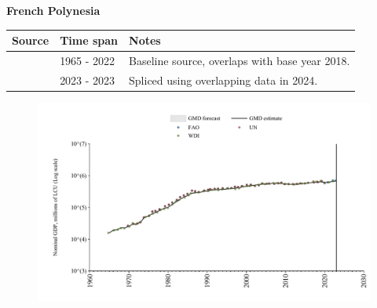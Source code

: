 \documentclass[12pt,a4paper,landscape]{article}
\begin{document}
\begin{adjustbox}{max totalsize={\paperwidth}{\paperheight},center}
\begin{minipage}[t][\textheight][t]{\textwidth}
\vspace*{0.5cm}
{}
\begin{center}
{\Large\bfseries French Polynesia}
\end{center}
\vspace{0.5cm}
\begin{table}[H]
\centering
\small
\begin{tabular}{|l|l|l|}
\hline
\textbf{Source} & \textbf{Time span} & \textbf{Notes} \\
\hline
\rowcolor{white}\cite{WDI}& 1965 - 2022 &Baseline source, overlaps with base year 2018.\\
\rowcolor{lightgray}\cite{FAO}& 2023 - 2023 &Spliced using overlapping data in 2024.\\
\hline
\end{tabular}
\end{table}
\begin{figure}[H]
\centering
\includegraphics[width=\textwidth,height=0.6\textheight,keepaspectratio]{graphs/PYF_nGDP.pdf}
\end{figure}
\end{minipage}
\end{adjustbox}
\end{document}
